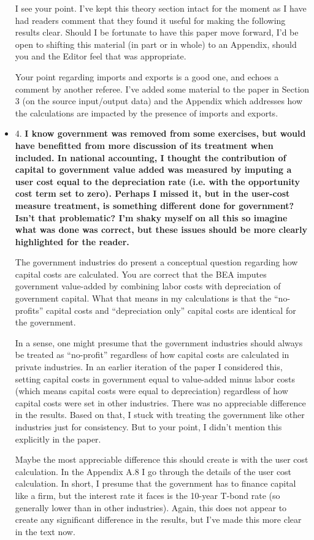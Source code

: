 \documentclass[11pt]{article}
\begin{document}
\begin{itemize}
	I see your point. I've kept this theory section intact for the moment as I have had readers comment that they found it useful for making the following results clear. Should I be fortunate to have this paper move forward, I'd be open to shifting this material (in part or in whole) to an Appendix, should you and the Editor feel that was appropriate. 

	Your point regarding imports and exports is a good one, and echoes a comment by another referee. I've added some material to the paper in Section 3 (on the source input/output data) and the Appendix which addresses how the calculations are impacted by the presence of imports and exports.

	\item 4. \textbf{I know government was removed from some exercises, but would have benefitted from more discussion of its treatment when included. In national accounting, I thought the contribution of capital to government value added was measured by imputing a user cost equal to the depreciation rate (i.e. with the opportunity cost term set to zero). Perhaps I missed it, but in the user-cost measure treatment, is something different done for government? Isn’t that problematic? I’m shaky myself on all this so imagine what was done was correct, but these issues should be more clearly highlighted for the reader.}

	The government industries do present a conceptual question regarding how capital costs are calculated. You are correct that the BEA imputes government value-added by combining labor costs with depreciation of government capital. What that means in my calculations is that the ``no-profits'' capital costs and ``depreciation only'' capital costs are identical for the government. 

	In a sense, one might presume that the government industries should always be treated as ``no-profit'' regardless of how capital costs are calculated in private industries. In an earlier iteration of the paper I considered this, setting capital costs in government equal to value-added minus labor costs (which means capital costs were equal to depreciation) regardless of how capital costs were set in other industries. There was no appreciable difference in the results. Based on that, I stuck with treating the government like other industries just for consistency. But to your point, I didn't mention this explicitly in the paper.

	Maybe the most appreciable difference this should create is with the user cost calculation. In the Appendix A.8 I go through the details of the user cost calculation. In short, I presume that the government has to finance capital like a firm, but the interest rate it faces is the 10-year T-bond rate (so generally lower than in other industries). Again, this does not appear to create any significant difference in the results, but I've made this more clear in the text now.


\end{itemize}
\end{document}
